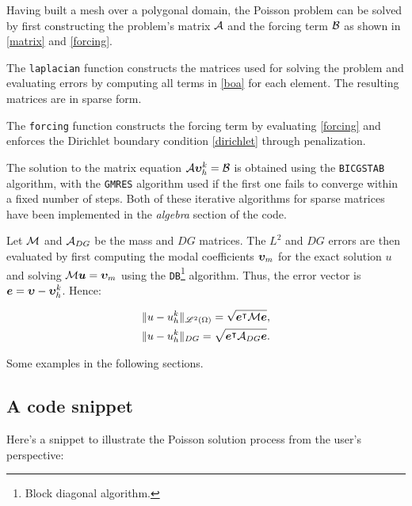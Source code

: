 Having built a mesh over a polygonal domain, the Poisson problem can be solved by first constructing the problem's matrix $\mathcal{A}$ and the forcing term $\mathcal{B}$ as shown in \eqref{matrix} and \eqref{forcing}.

The \lstinline{laplacian} function constructs the matrices used for solving the problem and evaluating errors by computing all terms in \eqref{boa} for each element. The resulting matrices are in sparse form.

The \lstinline{forcing} function constructs the forcing term by evaluating \eqref{forcing} and enforces the Dirichlet boundary condition \eqref{dirichlet} through penalization.

\cite{Saad2003} The solution to the matrix equation $\mathcal{A} \bm{\upsilon}^k_h = \mathcal{B}$ is obtained using the \lstinline{BICGSTAB} algorithm, with the \lstinline{GMRES} algorithm used if the first one fails to converge within a fixed number of steps. Both of these iterative algorithms for sparse matrices have been implemented in the \textit{algebra} section of the code.

Let $\mathcal{M}$ and $\mathcal{A}_{DG}$ be the mass and $DG$ matrices. The $L^2$ and $DG$ errors are then evaluated by first computing the modal coefficients $\bm{\upsilon}_m$ for the exact solution $u$ and solving $\mathcal{M} \bm{u} = \bm{\upsilon}_m$ using the \lstinline{DB}\footnote{Block diagonal algorithm.} algorithm. Thus, the error vector is $\bm{e} = \bm{\upsilon} - \bm{\upsilon}^k_h$. Hence:

\begin{gather}
    \lVert u - u^k_h \rVert_{\mathscr{L}^2(\Omega)} = \sqrt{\bm{e}^\intercal \mathcal{M} \bm{e}}, \\
    \lVert u - u^k_h \rVert_{DG} = \sqrt{\bm{e}^\intercal \mathcal{A}_{DG} \bm{e}}.
\end{gather}

Some examples in the following sections.

\newpage
\subsection{A code snippet}

Here's a snippet to illustrate the Poisson solution process from the user's perspective:

